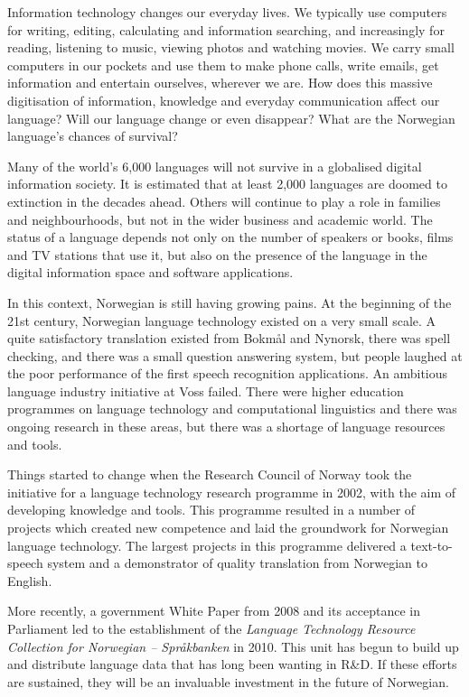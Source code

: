 \begin{multicols}{2}
Information technology changes our everyday lives. We typically use computers for writing, editing, calculating and information searching, and increasingly for reading, listening to music, viewing photos and watching movies. We carry small computers in our pockets and use them to make phone calls, write emails, get information and entertain ourselves, wherever we are. How does this massive digitisation of information, knowledge and everyday communication affect our language? Will our language change or even disappear? What are the Norwegian language’s chances of survival?

Many of the world’s 6,000 languages will not survive in a globalised digital information society. It is estimated that at least 2,000 languages are doomed to extinction in the decades ahead. Others will continue to play a role in families and neighbourhoods, but not in the wider business and academic world. The status of a language depends not only on the number of speakers or books, films and TV stations that use it, but also on the presence of the language in the digital information space and software applications. 

In this context, Norwegian is still having growing pains. At the beginning of the 21st century, Norwegian language technology existed on a very small scale. A quite satisfactory translation existed from Bokmål and Nynorsk, there was spell checking, and there was a small question answering system, but people laughed at the poor performance of the first speech recognition applications. An ambitious language industry initiative at Voss failed. There were higher education programmes on language technology and computational linguistics and there was ongoing research in these areas, but there was a shortage of language resources and tools. 

Things started to change when the Research Council of Norway took the initiative for a language technology research programme in 2002, with the aim of developing knowledge and tools. This programme resulted in a number of projects which created new competence and laid the groundwork for Norwegian language technology. The largest projects in this programme delivered a text-to-speech system and a demonstrator of quality translation from Norwegian to English.

More recently, a government White Paper from 2008 \cite{stm35:2008} and its acceptance in Parliament led to the establishment of the \emph{Language Technology Resource Collection for Norwegian -- Språkbanken} in 2010. This unit has begun to build up and distribute language data that has long been wanting in R\&D. If these efforts are sustained, they will be an invaluable investment in the future of Norwegian.


\end{multicols}
